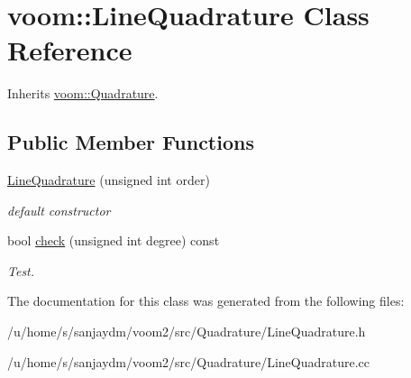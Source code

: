 \hypertarget{classvoom_1_1_line_quadrature}{
\section{voom::LineQuadrature Class Reference}
\label{classvoom_1_1_line_quadrature}
}


Inherits \hyperlink{classvoom_1_1_quadrature}{voom::Quadrature}.\subsection*{Public Member Functions}
\begin{DoxyCompactItemize}
\item 
\hypertarget{classvoom_1_1_line_quadrature_a77e21fa2dd459590a3f2af6126ba6cd0}{
\hyperlink{classvoom_1_1_line_quadrature_a77e21fa2dd459590a3f2af6126ba6cd0}{LineQuadrature} (unsigned int order)}
\label{classvoom_1_1_line_quadrature_a77e21fa2dd459590a3f2af6126ba6cd0}

\begin{DoxyCompactList}\small\item\em default constructor \item\end{DoxyCompactList}\item 
\hypertarget{classvoom_1_1_line_quadrature_a6a9d656053fb790567d825e542060424}{
bool \hyperlink{classvoom_1_1_line_quadrature_a6a9d656053fb790567d825e542060424}{check} (unsigned int degree) const }
\label{classvoom_1_1_line_quadrature_a6a9d656053fb790567d825e542060424}

\begin{DoxyCompactList}\small\item\em Test. \item\end{DoxyCompactList}\end{DoxyCompactItemize}


The documentation for this class was generated from the following files:\begin{DoxyCompactItemize}
\item 
/u/home/s/sanjaydm/voom2/src/Quadrature/LineQuadrature.h\item 
/u/home/s/sanjaydm/voom2/src/Quadrature/LineQuadrature.cc\end{DoxyCompactItemize}
